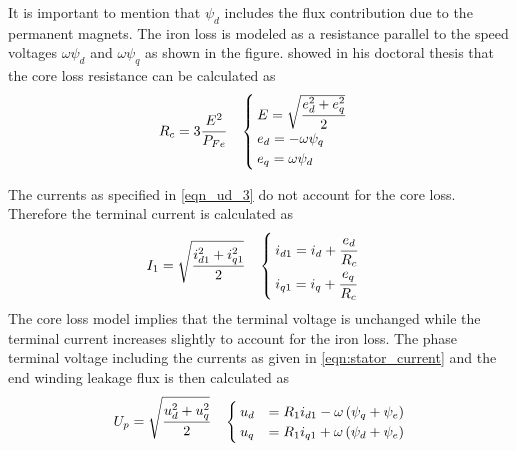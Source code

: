 It is important to mention that $\psi_d$ includes the flux contribution due to the permanent magnets. The iron loss is modeled as a resistance parallel to the speed voltages $\omega \psi_d$ and $\omega \psi_q$ as shown in the figure. \cite{Kamper1996} showed in his doctoral thesis that the core loss resistance can be calculated as
\begin{equation}
  \label{eqn:Rc}
  R_c = 3\cfrac{E^{2}}{P_{Fe}}
  \quad
  \begin{cases}
    E = \sqrt{\cfrac{e_{d}^{2}+e_{q}^{2}}{2}}\\
    e_d = -\omega \psi_q \\
    e_q = \omega \psi_d 
  \end{cases}
\end{equation}

The currents as specified in \eqref{eqn_ud_3} do not account for the core loss. Therefore the terminal current is calculated as
\begin{equation}
\label{eqn:stator_current}
  I_1 = \sqrt{\cfrac{i_{d1}^{2}+i_{q1}^{2}}{2}}
  \quad
  \begin{cases}
    i_{d1} = i_d+\cfrac{e_d}{R_c}\\
    i_{q1} = i_q+\cfrac{e_q}{R_c}
  \end{cases}
\end{equation}
The core loss model implies that the terminal voltage is unchanged while the terminal current increases slightly to account for the iron loss. The phase terminal voltage including the currents as given in \eqref{eqn:stator_current} and the end winding leakage flux is then calculated as
\begin{equation}
  \label{eqn:Up}
  U_p = \sqrt{\cfrac{u_{d}^{2}+u_{q}^{2}}{2}}
  \quad
  \begin{cases}  
    u_d &= R_{1}i_{d1} - \omega \left(\psi_{q} + \psi_{e}\right) \\
    u_q &= R_{1}i_{q1} + \omega \left(\psi_{d} + \psi_{e}\right)    
  \end{cases}
\end{equation}

